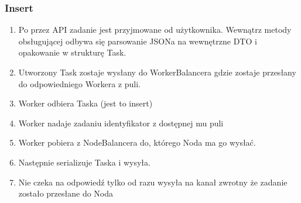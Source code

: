 \documentclass[paper=a4, fontsize=11pt]{scrartcl} %
\numberwithin{equation}{section} %
\numberwithin{figure}{section} %
\numberwithin{table}{section} %
\begin{document}
	\subsubsection{Insert}
		\begin{enumerate}
			\item Po przez API zadanie jest przyjmowane od użytkownika. Wewnątrz metody obsługującej odbywa się parsowanie JSONa na wewnętrzne DTO i opakowanie w strukturę Task.
			\item Utworzony Task zostaje wysłany do WorkerBalancera gdzie zostaje przesłany do odpowiedniego Workera z puli.
			\item Worker odbiera Taska (jest to insert) 
			\item Worker nadaje zadaniu identyfikator z dostępnej mu puli
			\item Worker pobiera z NodeBalancera do, którego Noda ma go wysłać. 
			\item Następnie serializuje Taska i wysyła. 
			\item Nie czeka na odpowiedź tylko od razu wysyła na kanał zwrotny że zadanie zostało przesłane do Noda
		\end{enumerate}
\end{document}
